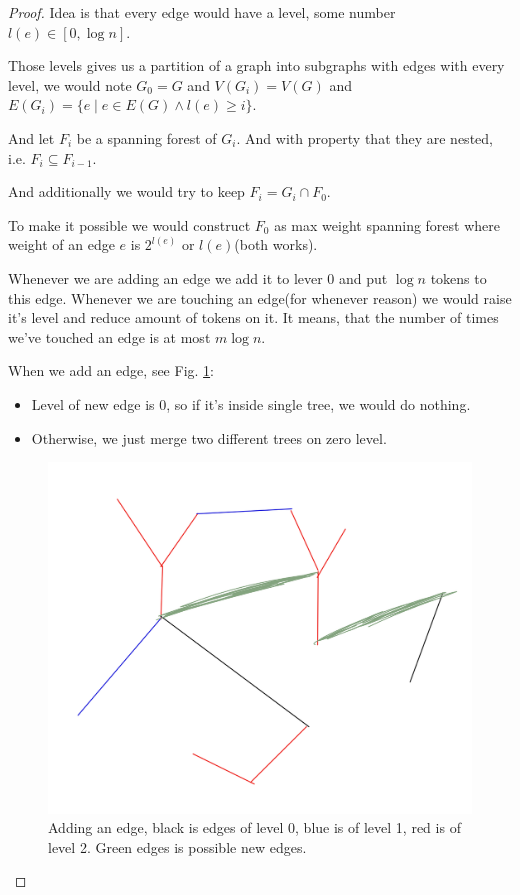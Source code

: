 \begin{proof}
Idea is that every edge would have a level, some number $l(e) \in [0, \log n]$.

Those levels gives us a partition of a graph into subgraphs with edges with every level, we would note $G_0 = G$ and $V(G_i) = V(G)$ and $E(G_i) = \{ e \mid e \in E(G) \wedge l(e) \geq i\}$.

And let $F_i$ be a spanning forest of $G_i$.
And with property that they are nested, i.e. $F_i \subseteq F_{i - 1}$.

And additionally we would try to keep $F_i = G_i \cap F_0$.

To make it possible we would construct $F_0$ as max weight spanning forest where weight of an edge $e$ is $2^{l(e)}$ or $l(e)$(both works).

Whenever we are adding an edge we add it to lever $0$ and put $\log n$ tokens to this edge.
Whenever we are touching an edge(for whenever reason) we would raise it's level and reduce amount of tokens on it.
It means, that the number of times we've touched an edge is at most $m \log n$.

When we add an edge, see Fig. \ref{fig:connectivity_adding_edge_spanning}:
\begin{itemize}
	\item Level of new edge is $0$, so if it's inside single tree, we would do nothing.
	\item Otherwise, we just merge two different trees on zero level.
\end{itemize}

\begin{figure}[H]
	\centering
	\includegraphics[width=0.5\linewidth]{figures/connectivity_adding_edge_spanning.jpeg}
	\caption{Adding an edge, black is edges of level 0, blue is of level 1, red is of level 2. Green edges is possible new edges.}
	\label{fig:connectivity_adding_edge_spanning}
\end{figure}


\end{proof}

